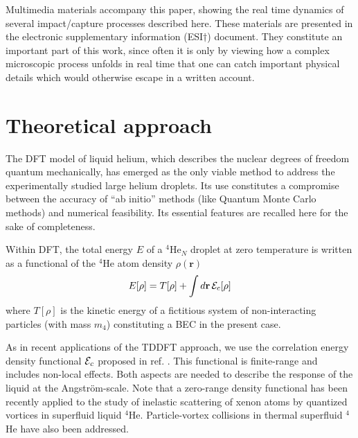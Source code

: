 Multimedia materials accompany this paper, 
showing the real time dynamics of several impact/capture processes 
described here. These materials  are presented 
in the electronic supplementary information (ESI$\dag$) document.
They constitute  an important part of this work, 
since often it is only by viewing how a complex microscopic process
unfolds in real time that one can catch important physical details 
which would otherwise escape in a written account. 

\section{Theoretical approach} 

The DFT model of liquid helium, 
which describes the nuclear degrees of freedom quantum 
mechanically, has emerged as the only 
viable method to address the experimentally studied large 
helium droplets. Its use constitutes a compromise between 
the accuracy of ``ab initio'' methods (like Quantum Monte Carlo 
methods\cite{Kro02}) and numerical feasibility.\cite{Bar06}
Its essential features are recalled here for the sake of completeness.
 
Within DFT, the total energy $E$ of a $^4$He$_N$ droplet  
at zero temperature is written as a functional of 
the $^4$He atom density $\rho ({\mathbf r})$ 
%
\begin{equation}
E[\rho] = T[\rho] + \int d{\mathbf r} \,{\cal E}_c[\rho]
\label{eq1}
\end{equation}
where $T[\rho]$ is the kinetic energy of
a fictitious system of non-interacting particles 
(with mass $m_4$) constituting a BEC in the present case.

As in recent applications of the TDDFT 
approach,\cite{Her12a,Mat14,Van14,Lea14b,Lea16,Van17}  
we use the correlation energy density functional 
${\cal E}_c$ 
proposed in ref. \cite{Anc05a}. 
This functional is finite-range and includes non-local effects.
Both aspects are needed to describe
 the response of the liquid at the Angstr\"om-scale.
 Note that  a  zero-range 
 density functional has been recently applied to the study of 
inelastic scattering of xenon atoms by quantized 
vortices in superfluid liquid $^4$He.\cite{Psh16}
Particle-vortex collisions in thermal superfluid $^4$He have also been addressed.\cite{Kiv08}


